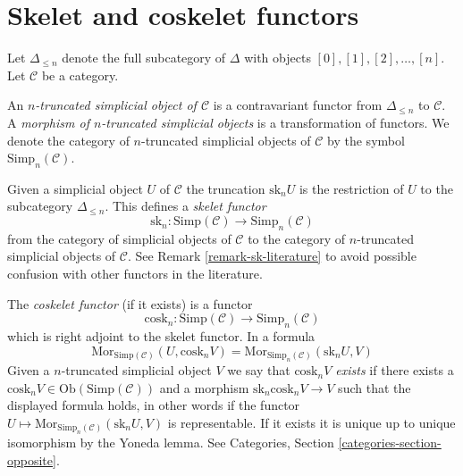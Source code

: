 \section{Skelet and coskelet functors}
\label{section-skelet}

\noindent
Let $\Delta_{\leq n}$ denote the full subcategory of
$\Delta$ with objects $[0], [1], [2], \ldots, [n]$.
Let $\mathcal{C}$ be a category.

\begin{definition}
\label{definition-truncated-simplicial-object}
An {\it $n$-truncated simplicial object of $\mathcal{C}$} 
is a contravariant functor from $\Delta_{\leq n}$ to
$\mathcal{C}$. A {\it morphism of $n$-truncated
simplicial objects} is a transformation of functors.
We denote the category of $n$-truncated
simplicial objects of $\mathcal{C}$ by
the symbol $\text{Simp}_n(\mathcal{C})$.
\end{definition}

\noindent
Given a simplicial object $U$ of $\mathcal{C}$
the truncation $\text{sk}_n U$ is the restriction
of $U$ to the subcategory $\Delta_{\leq n}$.
This defines a {\it skelet functor}
$$
\text{sk}_n :
\text{Simp}(\mathcal{C}) \longrightarrow \text{Simp}_n(\mathcal{C})
$$
from the category of simplicial objects of $\mathcal{C}$
to the category of $n$-truncated simplicial objects of $\mathcal{C}$.
See Remark \ref{remark-sk-literature} to avoid possible confusion
with other functors in the literature.

\medskip\noindent
The {\it coskelet functor} (if it exists) is a functor
$$
\text{cosk}_n :
\text{Simp}(\mathcal{C}) \longrightarrow \text{Simp}_n(\mathcal{C})
$$
which is right adjoint to the skelet functor. In a formula
\begin{equation}
\label{equation-cosk}
\text{Mor}_{\text{Simp}(\mathcal{C})}(U, \text{cosk}_n V)
=
\text{Mor}_{\text{Simp}_n(\mathcal{C})}(\text{sk}_n U, V)
\end{equation}
Given a $n$-truncated simplicial object $V$ we 
say that {\it $\text{cosk}_nV$ exists} if there
exists a $\text{cosk}_nV \in \text{Ob}(\text{Simp}(\mathcal{C}))$
and a morphism $\text{sk}_n \text{cosk}_n V \to V$
such that the displayed formula holds, in other words
if the functor
$U \mapsto \text{Mor}_{\text{Simp}_n(\mathcal{C})}(\text{sk}_n U, V)$
is representable. If it exists it
is unique up to unique isomorphism by the Yoneda lemma.
See Categories, Section \ref{categories-section-opposite}.

